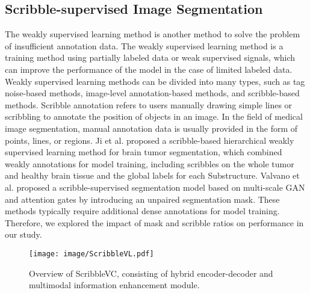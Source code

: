 \documentclass[sigconf,natbib=false]{acmart}
\begin{document}
\subsection{Scribble-supervised Image Segmentation}
The weakly supervised learning method is another method to solve the problem of insufficient annotation data. The weakly supervised learning method is a training method using partially labeled data or weak supervised signals, which can improve the performance of the model in the case of limited labeled data. Weakly supervised learning methods can be divided into many types, such as tag noise-based methods, image-level annotation-based methods, and scribble-based methods. Scribble annotation refers to users manually drawing simple lines or scribbling to annotate the position of objects in an image. In the field of medical image segmentation, manual annotation data is usually provided in the form of points, lines, or regions. Ji et al. \cite{ji2019scribble} proposed a scribble-based hierarchical weakly supervised learning method for brain tumor segmentation, which combined weakly annotations for model training, including scribbles on the whole tumor and healthy brain tissue and the global labels for each Substructure. Valvano et al. \cite{MAAG} proposed a scribble-supervised segmentation model based on multi-scale GAN and attention gates by introducing an unpaired segmentation mask. These methods typically require additional dense annotations for model training. Therefore, we explored the impact of mask and scribble ratios on performance in our study.

\begin{figure*}[!h]
  \setlength{\abovecaptionskip}{-1mm}
  \centering
    \texttt{[image: image/ScribbleVL.pdf]}
  \caption{Overview of ScribbleVC, consisting of hybrid encoder-decoder and multimodal information enhancement module.}
  \label{fig:vlnetwork}
  \vspace{-4mm}
\end{figure*}
\vspace{-2mm}
\end{document}
